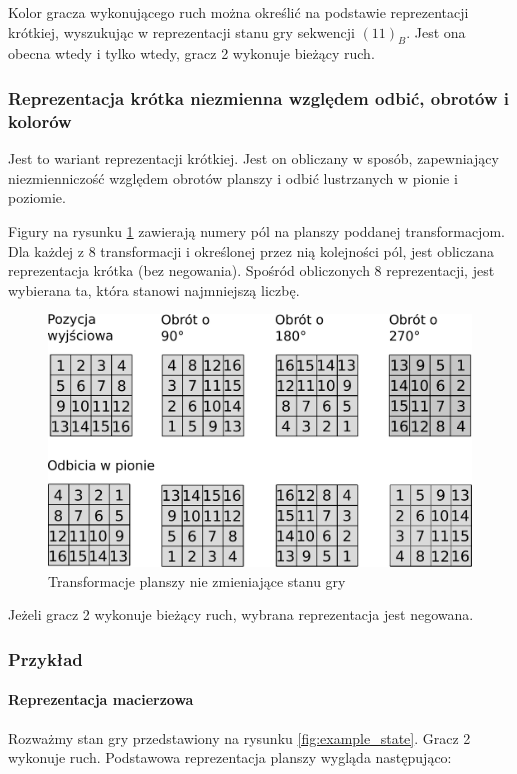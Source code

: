 \documentclass{scrartcl}
\begin{document}
Kolor gracza wykonującego ruch można określić na podstawie
reprezentacji krótkiej, wyszukując w
reprezentacji stanu gry sekwencji $(11)_B$. Jest ona obecna wtedy i
tylko wtedy, gracz 2 wykonuje bieżący ruch.

\subsubsection{Reprezentacja krótka niezmienna względem odbić,
  obrotów i kolorów}
Jest to wariant reprezentacji krótkiej. Jest on obliczany w sposób,
zapewniający 
niezmienniczość względem obrotów planszy i odbić lustrzanych w pionie
i poziomie. 

Figury na rysunku \ref{fig:field_order2} zawierają numery pól na
planszy poddanej transformacjom. Dla każdej z 8 transformacji i
określonej przez nią kolejności pól, jest obliczana reprezentacja 
krótka (bez negowania). Spośród obliczonych 8 reprezentacji, 
jest wybierana ta, która stanowi najmniejszą liczbę.

\begin{figure}[h]
  \centering
  \includegraphics[width=\textwidth]{data/field_order2.pdf}
  \caption{Transformacje planszy nie zmieniające stanu gry}
  \label{fig:field_order2}
\end{figure}

Jeżeli gracz 2 wykonuje bieżący ruch, wybrana reprezentacja jest
negowana.

\subsubsection{Przykład}

\paragraph{Reprezentacja macierzowa} Rozważmy stan gry przedstawiony na rysunku \ref{fig:example_state}.
Gracz 2 wykonuje ruch. Podstawowa reprezentacja planszy wygląda
następująco:
\end{document}
